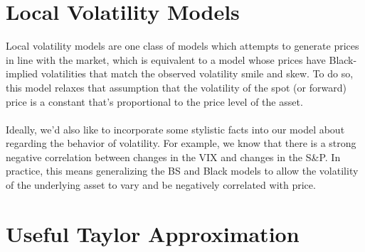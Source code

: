 \documentclass[12pt]{article}
\theoremstyle{plain}
\theoremstyle{definition}
\theoremstyle{remark}
\begin{document}
\newpage
\section{Local Volatility Models}

Local volatility models are one class of models which attempts to 
generate prices in line with
the market, which is equivalent to a model
whose prices have Black-implied volatilities that match the observed
volatility smile and skew.  To do so, this model relaxes that 
assumption that the volatility of the spot (or forward) price
is a constant that's proportional to the price level of the asset.
\\
\\
Ideally, we'd also like to incorporate some stylistic facts into
our model about regarding the behavior of volatility. For example,
we know that there is a strong negative correlation between
changes in the VIX and changes in the S\&P.  In practice, this means
generalizing the BS and Black models to allow the volatility
of the underlying asset to vary and be negatively correlated with price.




\newpage
\appendix

\clearpage
\section{Useful Taylor Approximation}
\end{document}
